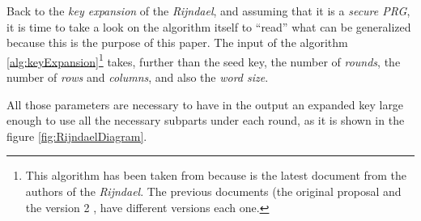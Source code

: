 \documentclass[10pt,a4paper,twoside]{llncs}
\begin{document}
Back to the \emph{key expansion} of the \emph{Rijndael}, and assuming that it is a \emph{secure PRG}, it is time to take a look on the algorithm itself to ``read'' what can be generalized because this is the purpose of this paper. The input of the algorithm \ref{alg:keyExpansion}\footnote{This algorithm has been taken from \cite{Daemen:2002:DR:560131} because is the latest document from the authors of the \emph{Rijndael}. The previous documents (the original proposal \cite{Daemen98aesproposal:} and the version 2 \cite{Daemen01aes-ammended}, have different versions each one.} takes, further than the seed key, the number of \emph{rounds}, the number of \emph{rows} and \emph{columns}, and also the \emph{word size}.

All those parameters are necessary to have in the output an expanded key large enough to use all the necessary subparts under each round, as it is shown in the figure \ref{fig:RijndaelDiagram}.
\end{document}
